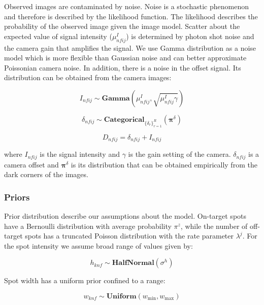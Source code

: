 Observed images are contaminated by noise. Noise is a stochastic phenomenon and therefore is described by the likelihood function. The likelihood describes the probability of the observed image given the image model. Scatter about the expected value of signal intensity ($\mu^I_{nfij}$) is determined by photon shot noise and the camera gain that amplifies the signal. We use Gamma distribution as a noise model which is more flexible than Gaussian noise and can better approximate Poissonian camera noise. In addition, there is a noise in the offset signal. Its distribution can be obtained from the camera images:

\begin{equation}
    I_{nfij} \sim \textbf{Gamma} (\mu^I_{nfij}, \sqrt{\mu^I_{nfij} \gamma})
\end{equation}

\begin{equation}
    \delta_{nfij} \sim \textbf{Categorical}_{\{ \delta_r \}^R_{r=1}}(\bm{\pi}^\delta)
\end{equation}

\begin{equation}
    D_{nfij} = \delta_{nfij} + I_{nfij}
\end{equation}

where $I_{nfij}$ is the signal intensity and $\gamma$ is the gain setting of the camera. $\delta_{nfij}$ is a camera offset and $\bm{\pi}^\delta$ is its distribution that can be obtained empirically from the dark corners of the images.

\subsubsection{Priors}
Prior distribution describe our assumptions about the model. On-target spots have a Bernoulli distribution with average probability $\pi^z$, while the number of off-target spots has a truncated Poisson distribution with the rate parameter $\lambda^j$. For the spot intensity we assume broad range of values given by:

\begin{equation}
    h_{knf} \sim \mathbf{HalfNormal}(\sigma^h)
\end{equation}
 
 Spot width has a uniform prior confined to a range:
 
\begin{equation}
    w_{knf} \sim \textbf{Uniform}(w_{\min}, w_{\max})
\end{equation}


